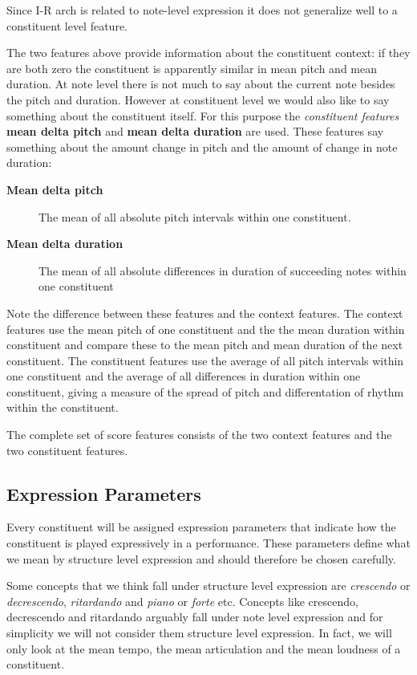 \documentclass[a4paper,10pt]{article}
\begin{document}
Since I-R arch is related to note-level expression it does not generalize well to a constituent level feature. 

The two features above provide information about the constituent context: if they are both zero the constituent is apparently similar in mean pitch and mean duration. At note level there is not much to say about the current note besides the pitch and duration. However at constituent level we would also like to say something about the constituent itself. For this purpose the \textit{constituent features} \textbf{mean delta pitch} and \textbf{mean delta duration} are used. These features say something about the amount change in pitch and the amount of change in note duration:
\begin{description}
\item[\textbf{Mean delta pitch}] The mean of all absolute pitch intervals within one constituent. 
\item[\textbf{Mean delta duration}] The mean of all absolute differences in duration of succeeding notes within one constituent
\end{description}

Note the difference between these features and the context features. The context features use the mean pitch of one constituent and the the mean duration within constituent and compare these to the mean pitch and mean duration of the next constituent. The constituent features use the average of all pitch intervals within one constituent and the average of all differences in duration within one constituent, giving a measure of the spread of pitch and differentation of rhythm within the constituent.

The complete set of score features consists of the two context features and the two constituent features. 



\subsection{Expression Parameters}
\label{sec:targets}

Every constituent will be assigned expression parameters that indicate how the constituent is played expressively in a performance. These parameters define what we mean by structure level expression and should therefore be chosen carefully. 

Some concepts that we think fall under structure level expression are \textit{crescendo} or \textit{decrescendo}, \textit{ritardando} and \textit{piano} or \textit{forte} etc.
Concepts like crescendo, decrescendo and ritardando arguably fall under note level expression and for simplicity we will not consider them structure level expression. In fact, we will only look at the mean tempo, the mean articulation and the mean loudness of a constituent.
\end{document}
